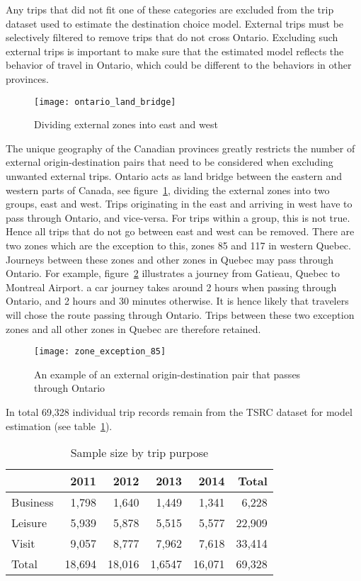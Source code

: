 Any trips that did not fit one of these categories are excluded from the trip dataset used to estimate the destination choice model. External trips must be selectively filtered to remove trips that do not cross Ontario. Excluding such external trips is important to make sure that the estimated model reflects the behavior of travel in Ontario, which could be different to the behaviors in other provinces. 

\begin{figure}[H]
\centering
\texttt{[image: ontario\_land\_bridge]}
\caption{Dividing external zones into east and west}
\label{fig:bridge}
\end{figure}

The unique geography of the Canadian provinces greatly restricts the number of external origin-destination pairs that need to be considered when excluding unwanted external trips. Ontario acts as land bridge between the eastern and western parts of Canada, see figure~\ref{fig:bridge}, dividing the external zones into two groups, east and west. Trips originating in the east and arriving in west have to pass through Ontario, and vice-versa. For trips within a group, this is not true. Hence all trips that do not go between east and west can be removed. There are two zones which are the exception to this, zones 85 and 117 in western Quebec. Journeys between these zones and other zones in Quebec may pass through Ontario. For example, figure~\ref{fig:exception85} illustrates a journey from Gatieau, Quebec to Montreal Airport. a car journey takes around 2 hours when passing through Ontario, and 2 hours and 30 minutes otherwise. It is hence likely that travelers will chose the route passing through Ontario. Trips between these two exception zones and all other zones in Quebec are therefore retained. 

\begin{figure}[H]
\centering
\texttt{[image: zone\_exception\_85]}
\caption{An example of an external origin-destination pair that passes through Ontario}
\label{fig:exception85}
\end{figure}

In total 69,328 individual trip records remain from the TSRC dataset for model estimation (see table~\ref{table:purpose-counts}). 

\begin{table}[H]
\centering
\caption{Sample size by trip purpose}
\label{table:purpose-counts}
\begin{tabular}{lrrrrr}
\toprule
			& 2011 	& 2012 	& 2013 	& 2014 	& Total \\
\midrule
Business 	& 1,798  & 1,640  & 1,449  & 1,341  & 6,228 \\
Leisure 	& 5,939  & 5,878  & 5,515  & 5,577  & 22,909 \\
Visit 		& 9,057  & 8,777  & 7,962  & 7,618  & 33,414 \\ 
\midrule
Total 		& 18,694 & 18,016 & 1,6547 & 16,071 & 69,328 \\ 
\bottomrule
\end{tabular}%

\end{table}

